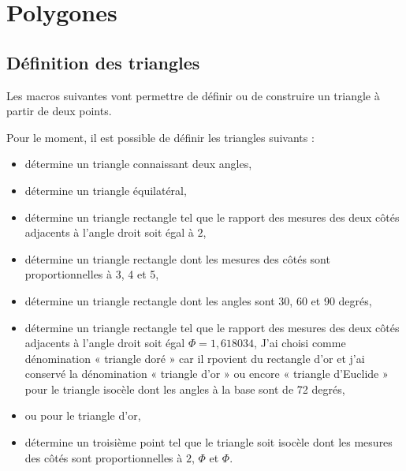 
\section{Polygones}
\subsection{Définition des  triangles} 
Les macros suivantes  vont permettre de définir ou de construire un triangle à partir  de deux points. 

 Pour le moment, il est possible de définir les triangles suivants :
 \begin{itemize}
\item  {}  détermine un triangle connaissant deux angles,
\item  {}  détermine un triangle équilatéral,
\item {} détermine un triangle rectangle tel que le rapport des mesures des deux côtés adjacents à l'angle droit soit égal à $2$,
\item {} détermine un triangle rectangle dont les mesures des côtés sont proportionnelles à 3, 4 et 5,
\item {} détermine un triangle rectangle dont les angles sont 30, 60 et 90 degrés,
\item {} détermine un triangle rectangle tel que le rapport des mesures des deux côtés adjacents à l'angle droit soit égal $\Phi=1,618034$, J'ai choisi comme dénomination « triangle doré » car il rpovient du rectangle d'or et j'ai conservé la dénomination « triangle d'or »  ou encore « triangle d'Euclide » pour le triangle isocèle dont les angles à la base sont de 72 degrés,

\item {} ou  pour le triangle d'or,

\item {} détermine un troisième point tel que le triangle soit isocèle  dont les mesures des côtés sont proportionnelles à $2$, $\Phi$ et $\Phi$.
\end{itemize}    

